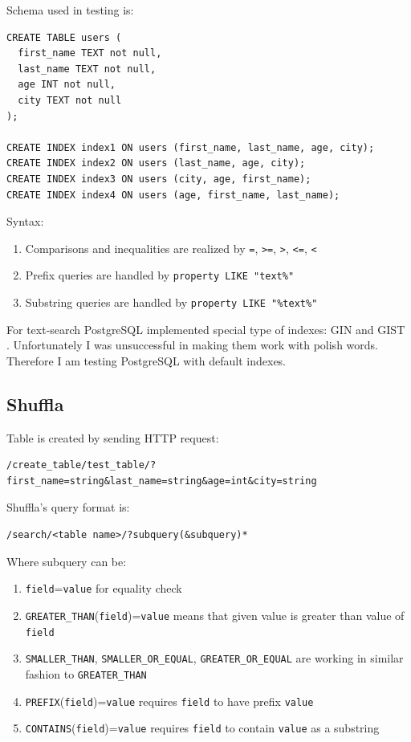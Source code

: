 \documentclass[10pt,a4paper]{article}
\begin{document}
Schema used in testing is:

\begin{verbatim}
CREATE TABLE users (
  first_name TEXT not null,
  last_name TEXT not null,
  age INT not null,
  city TEXT not null
);

CREATE INDEX index1 ON users (first_name, last_name, age, city);
CREATE INDEX index2 ON users (last_name, age, city);
CREATE INDEX index3 ON users (city, age, first_name);
CREATE INDEX index4 ON users (age, first_name, last_name);
\end{verbatim}

Syntax:
\begin{enumerate}
\item Comparisons and inequalities are realized by \verb|=|, \verb|>=|, \verb|>|, \verb|<=|, \verb|<|
\item Prefix queries are handled by \verb|property LIKE "text%"|
\item Substring queries are handled by \verb|property LIKE "%text%"|
\end{enumerate}

For text-search PostgreSQL implemented special type of indexes: GIN \cite{PSQLGIN} and GIST \cite{PSQLGIST}. Unfortunately I was unsuccessful in making them work with polish words. Therefore I am testing PostgreSQL with default indexes.

\subsection{Shuffla}

Table is created by sending HTTP request:
\begin{verbatim}
/create_table/test_table/?first_name=string&last_name=string&age=int&city=string
\end{verbatim}
Shuffla's query format is:

\begin{verbatim}
/search/<table name>/?subquery(&subquery)*
\end{verbatim}
Where subquery can be:
\begin{enumerate}
\item \verb|field|=\verb|value| for equality check
\item \verb|GREATER_THAN|(\verb|field|)=\verb|value| means that given value is greater than value of \verb|field| 
\item \verb|SMALLER_THAN|, \verb|SMALLER_OR_EQUAL|, \verb|GREATER_OR_EQUAL| are working in similar fashion to \verb|GREATER_THAN|
\item \verb|PREFIX|(\verb|field|)=\verb|value| requires \verb|field| to have prefix \verb|value|
\item \verb|CONTAINS|(\verb|field|)=\verb|value| requires \verb|field| to contain \verb|value| as a substring
\end{enumerate}
\end{document}

